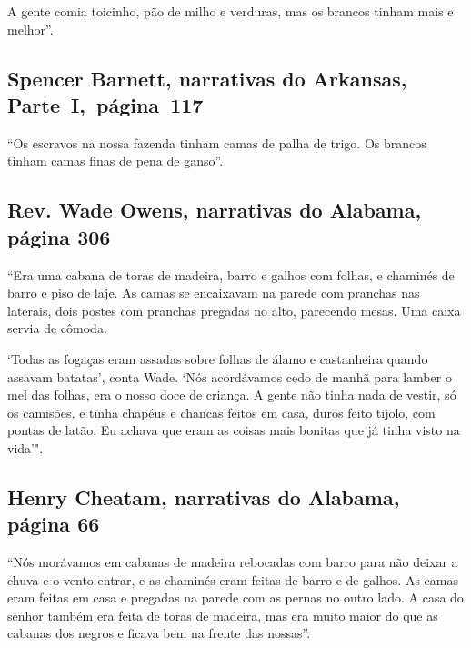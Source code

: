 A gente comia toicinho, pão de milho e verduras, mas os brancos tinham
mais e melhor''.

\subsection{Spencer Barnett, narrativas do Arkansas, Parte~I,~página~117} \label{ref17}

``Os escravos na nossa fazenda tinham camas de palha de trigo. Os
brancos tinham camas finas de pena de ganso''.

\subsection{Rev. Wade Owens, narrativas do Alabama, página 306}
\label{ref206}

``Era uma cabana de toras de madeira, barro e galhos com folhas, e
chaminés de barro e piso de laje. As camas se encaixavam na parede com
pranchas nas laterais, dois postes com pranchas pregadas no alto,
parecendo mesas. Uma caixa servia de cômoda.

`Todas as fogaças eram assadas sobre folhas de álamo e castanheira
quando assavam batatas', conta Wade. `Nós acordávamos cedo de manhã para
lamber o mel das folhas, era o nosso doce de criança. A gente não tinha
nada de vestir, só os camisões, e tinha chapéus e chancas feitos em
casa, duros feito tijolo, com pontas de latão. Eu achava que eram as
coisas mais bonitas que já tinha visto na vida'".

\subsection{Henry Cheatam, narrativas do Alabama, página 66} \label{ref54}

``Nós morávamos em cabanas de madeira rebocadas com barro para não
deixar a chuva e o vento entrar, e as chaminés eram feitas de barro e de
galhos. As camas eram feitas em casa e pregadas na parede com as pernas
no outro lado. A casa do senhor também era feita de toras de madeira,
mas era muito maior do que as cabanas dos negros e ficava bem na frente
das nossas''.

